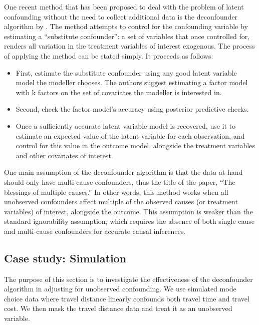 One recent method that has been proposed to deal with the problem of latent
confounding without the need to collect additional data is the deconfounder
algorithm by \citet{wang_2019_blessings}. The method attempts to control for the
confounding variable by estimating a ``substitute confounder'': a set of variables
that once controlled for, renders all variation in the treatment variables of
interest exogenous. The process of applying the method can be stated simply.
It proceeds as follows:
\begin{itemize}
	\item First, estimate the substitute confounder using any good latent variable
	model the modeller chooses. The authors suggest estimating a factor model
	with k factors on the set of covariates the modeller is interested in.
	\item Second, check the factor model's accuracy using posterior predictive
	checks.
	\item Once a sufficiently accurate latent variable model is recovered, use it
	to estimate an expected value of the latent variable for each observation,
	and control for this value in the outcome model, alongside the treatment
	variables and other covariates of interest.
\end{itemize}



One main assumption of the deconfounder algorithm is that the data at hand
should only have multi-cause confounders, thus the title of the paper, ``The
blessings of multiple causes.'' In other words, this method works when all
unobserved confounders affect multiple of the observed causes (or treatment
variables) of interest, alongside the outcome. This assumption is weaker than
the standard ignorability assumption, which requires the absence of both
single cause and multi-cause confounders for accurate causal inferences.



\subsection{Case study: Simulation}
\label{sec:deconfounder-simulation}

The purpose of this section is to investigate the effectiveness of the
deconfounder algorithm \citep{wang_2019_blessings} in adjusting for unobserved
confounding. We use simulated mode choice data where travel distance
linearly confounds both travel time and travel cost. We then mask the travel
distance data and treat it as an unobserved variable.


